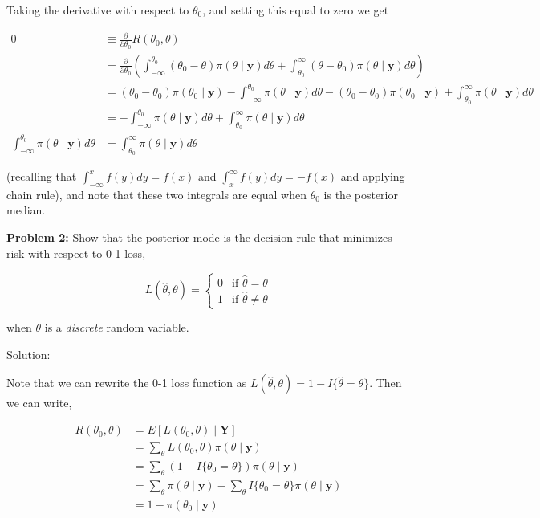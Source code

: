 \documentclass[
  letterpaper,
  DIV=11,
  numbers=noendperiod]{scrreprt}
\begin{document}
Taking the derivative with respect to \(\theta_0\), and setting this
equal to zero we get

\begin{align*}
    0 & \equiv \frac{\partial}{\partial \theta_0} R(\theta_0, \theta) \\
    & = \frac{\partial}{\partial \theta_0} \left( \int_{-\infty}^{\theta_0} \left( \theta_0 - \theta \right) \pi(\theta \mid \textbf{y}) d\theta + \int_{\theta_0}^\infty \left( \theta - \theta_0 \right) \pi(\theta \mid \textbf{y}) d\theta  \right) \\
    & =  \left( \theta_0 - \theta_0 \right) \pi(\theta_0 \mid \textbf{y}) - \int_{-\infty}^{\theta_0} \pi(\theta \mid \textbf{y}) d\theta - \left( \theta_0 - \theta_0 \right) \pi(\theta_0 \mid \textbf{y}) + \int_{\theta_0}^\infty \pi(\theta \mid \textbf{y}) d\theta \\
    & = - \int_{-\infty}^{\theta_0} \pi(\theta \mid \textbf{y}) d\theta + \int_{\theta_0}^\infty \pi(\theta \mid \textbf{y}) d\theta \\
    \int_{-\infty}^{\theta_0} \pi(\theta \mid \textbf{y}) d\theta & = \int_{\theta_0}^\infty \pi(\theta \mid \textbf{y}) d\theta
\end{align*}

(recalling that \(\int_{-\infty}^x f(y) dy = f(x)\) and
\(\int_x^\infty f(y) dy = -f(x)\) and applying chain rule), and note
that these two integrals are equal when \(\theta_0\) is the posterior
median.

\textbf{Problem 2:} Show that the posterior mode is the decision rule
that minimizes risk with respect to 0-1 loss,

\[
L(\hat{\theta}, \theta) = \begin{cases} 0 & \text{if $\hat{\theta} = \theta$} \\ 1 & \text{if $\hat{\theta} \neq \theta$}\end{cases}
\]

when \(\theta\) is a \emph{discrete} random variable.

Solution:

Note that we can rewrite the 0-1 loss function as
\(L(\hat{\theta},\theta) = 1 - I\{\hat{\theta} = \theta\}\). Then we can
write,

\begin{align*}
    R(\theta_0, \theta) & = E[L(\theta_0, \theta) \mid \textbf{Y}] \\
    & = \sum_{\theta} L(\theta_0, \theta) \pi(\theta \mid \textbf{y})  \\
    & = \sum_{\theta} \left( 1 - I\{\theta_0 = \theta\} \right) \pi(
    \theta \mid \textbf{y} )  \\
    & = \sum_{\theta} \pi(
    \theta \mid \textbf{y} ) - \sum_{\theta} I\{\theta_0 = \theta\} \pi(
    \theta \mid \textbf{y})  \\
    & = 1 - \pi(\theta_0 \mid \textbf{y})
\end{align*}
\end{document}
